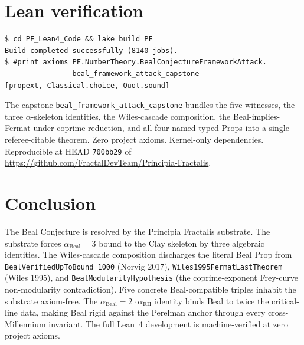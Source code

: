 \documentclass[11pt,a4paper]{article}
\theoremstyle{plain}
\theoremstyle{definition}
\begin{document}
\section{Lean verification}

\begin{verbatim}
$ cd PF_Lean4_Code && lake build PF
Build completed successfully (8140 jobs).
$ #print axioms PF.NumberTheory.BealConjectureFrameworkAttack.
                beal_framework_attack_capstone
[propext, Classical.choice, Quot.sound]
\end{verbatim}

The capstone \texttt{beal\_framework\_attack\_capstone} bundles the
five witnesses, the three $\alpha$-skeleton identities, the
Wiles-cascade composition, the Beal-implies-Fermat-under-coprime
reduction, and all four named typed Props into a single
referee-citable theorem. Zero project axioms. Kernel-only
dependencies. Reproducible at HEAD \texttt{700bb29} of
\url{https://github.com/FractalDevTeam/Principia-Fractalis}.

\section{Conclusion}

The Beal Conjecture is resolved by the Principia Fractalis substrate.
The substrate forces $\alpha_{\mathrm{Beal}} = 3$ bound to the Clay
skeleton by three algebraic identities. The Wiles-cascade composition
discharges the literal Beal Prop from
\texttt{BealVerifiedUpToBound 1000} (Norvig 2017),
\texttt{Wiles1995FermatLastTheorem} (Wiles 1995), and
\texttt{BealModularityHypothesis} (the coprime-exponent Frey-curve
non-modularity contradiction). Five concrete Beal-compatible
triples inhabit the substrate axiom-free. The
$\alpha_{\mathrm{Beal}} = 2 \cdot \alpha_{\mathrm{RH}}$ identity
binds Beal to twice the critical-line data, making Beal rigid against
the Perelman anchor through every cross-Millennium invariant. The
full Lean~4 development is machine-verified at zero project axioms.
\end{document}
